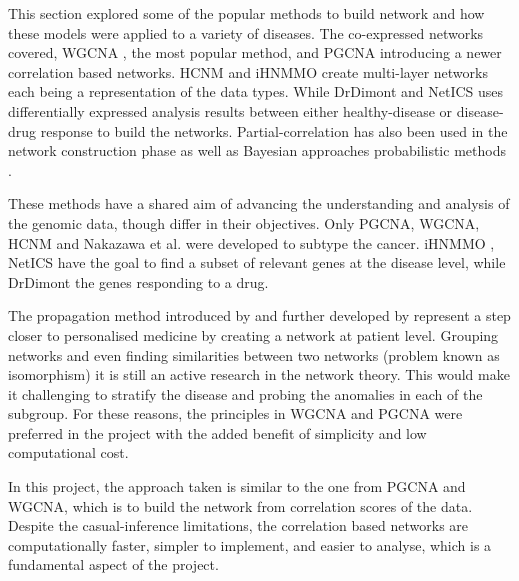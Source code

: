This section explored some of the popular methods to build network and how these models were applied to a variety of diseases. The co-expressed networks covered, WGCNA \citep{Langfelder2008-sn}, the most popular method, and PGCNA \citep{Care2019-ij} introducing a newer correlation based networks. HCNM \citep{Vangimalla2021-fc} and iHNMMO \citep{Peng2017-ik} create multi-layer networks each being a representation of the data types. While DrDimont \citep{Hiort2022-lk} and NetICS \citep{Dimitrakopoulos2018-br} uses differentially expressed analysis results between either healthy-disease or disease-drug response to build the networks. Partial-correlation has also been used in the network construction phase \citep{De_la_Fuente2004-ts} as well as Bayesian approaches probabilistic methods \citep{Nakazawa2021-yq, Tamada2011-ok, Tanaka2020-mw}.

These methods have a shared aim of advancing the understanding and analysis of the genomic data, though differ in their objectives. Only PGCNA, WGCNA, HCNM and Nakazawa et al. were developed to subtype the cancer. iHNMMO \citep{Peng2017-ik}, NetICS \citep{Dimitrakopoulos2018-br} have the goal to find a subset of relevant genes at the disease level, while DrDimont \citep{Hiort2022-lk} the genes responding to a drug. 

The propagation method introduced by \citet{Hofree2013-ld} and further developed by \citet{He2017-dj} represent a step closer to personalised medicine by creating a network at patient level. Grouping networks and even finding similarities between two networks (problem known as isomorphism) it is still an active research in the network theory. This would make it challenging to stratify the disease and probing the anomalies in each of the subgroup. For these reasons, the principles in WGCNA and PGCNA were preferred in the project with the added benefit of simplicity and low computational cost.


In this project, the approach taken is similar to the one from PGCNA and WGCNA, which is to build the network from correlation scores of the data. Despite the casual-inference limitations, the correlation based networks are computationally faster, simpler to implement, and easier to analyse, which is a fundamental aspect of the project.